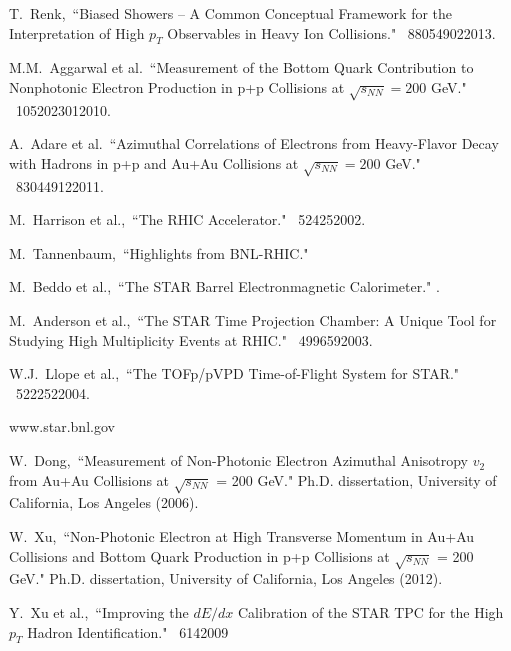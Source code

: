 \begin{thebibliography}{1000}
T.~Renk,~``Biased Showers -- A Common Conceptual Framework for the Interpretation of High $p_T$ Observables in Heavy Ion Collisions." \Journal{\PRC} {~88}{054902}{2013}.

M.M.~Aggarwal et al.~``Measurement of the Bottom Quark Contribution to Nonphotonic Electron Production in p+p Collisions at $\sqrt{s_{NN}} = 200$ GeV." \Journal{\PRL} {~105}{202301}{2010}.

A.~Adare et al.~``Azimuthal Correlations of Electrons from Heavy-Flavor Decay with Hadrons in p+p and Au+Au Collisions at $\sqrt{s_{NN}} = 200$ GeV." \Journal{\PRC} {~83}{044912}{2011}.


M.~Harrison et al.,~``The RHIC Accelerator." \Journal{\ARNPS} {~52}{425}{2002}.

M.~Tannenbaum,~``Highlights from BNL-RHIC." 

M.~Beddo et al.,~``The STAR Barrel Electronmagnetic Calorimeter." .

M.~Anderson et al.,~``The STAR Time Projection Chamber: A Unique Tool for Studying High Multiplicity Events at RHIC." \Journal{\NIM } {~499}{659}{2003}.

W.J.~Llope et al.,~``The TOFp/pVPD Time-of-Flight System for STAR." \Journal{\NIM} {~522}{252}{2004}.

www.star.bnl.gov

W.~Dong,~``Measurement of Non-Photonic Electron Azimuthal Anisotropy $v_2$ from Au+Au Collisions at $\sqrt{s_{NN}}$ = 200 GeV." Ph.D. dissertation, University of California, Los Angeles (2006).

W.~Xu,~``Non-Photonic Electron at High Transverse Momentum in Au+Au Collisions and Bottom Quark Production in p+p Collisions at $\sqrt{s_{NN}}$ = 200 GeV." Ph.D. dissertation, University of California, Los Angeles (2012).

Y.~Xu et al.,~``Improving the $dE/dx$ Calibration of the STAR TPC for the High $p_T$ Hadron Identification." \Journal{\NIM} {~614}{}{2009}


\end{thebibliography}
